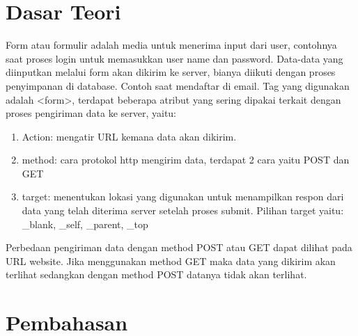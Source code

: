\documentclass[a4paper,12pt]{article}
\begin{document}
\section{Dasar Teori}
Form atau formulir adalah media untuk menerima input dari user, contohnya saat
proses login untuk memasukkan user name dan password. Data-data yang diinputkan
melalui form akan dikirim ke server, bianya diikuti dengan proses penyimpanan di
database. Contoh saat mendaftar di email.
Tag yang digunakan adalah <form>, terdapat beberapa atribut yang sering dipakai
terkait dengan proses pengiriman data ke server, yaitu:
\begin{enumerate}
    \item Action: mengatir URL kemana data akan dikirim.
    \item method: cara protokol http mengirim data, terdapat 2 cara yaitu POST dan GET
    \item target: menentukan lokasi yang digunakan untuk menampilkan respon dari
data yang telah diterima server setelah proses submit. Pilihan target yaitu: \_blank,
\_self, \_parent, \_top
\end{enumerate}
Perbedaan pengiriman data dengan method POST atau GET dapat dilihat pada URL
website. Jika menggunakan method GET maka data yang dikirim akan terlihat sedangkan
dengan method POST datanya tidak akan terlihat.

\newpage

\section{Pembahasan}
\end{document}
